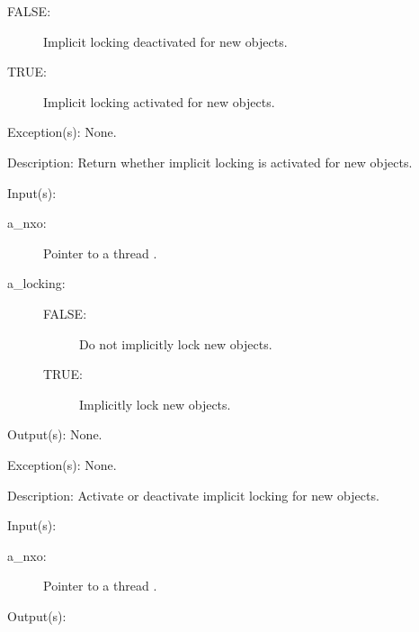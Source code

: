 \begin{capi}
\begin{capilist}
\begin{description}
			\begin{description}\item[]
			\item[FALSE: ]
				Implicit locking deactivated for new objects.
			\item[TRUE: ]
				Implicit locking activated for new objects.
			\end{description}
		\end{description}
	\item[Exception(s): ] None.
	\item[Description: ]
		Return whether implicit locking is activated for new objects.
	\end{capilist}
\label{nxo_thread_setlocking}
	\begin{capilist}
	\item[Input(s): ]
		\begin{description}\item[]
		\item[a\_nxo: ]
			Pointer to a thread .
		\item[a\_locking: ]
			\begin{description}\item[]
			\item[FALSE: ]
				Do not implicitly lock new objects.
			\item[TRUE: ]
				Implicitly lock new objects.
			\end{description}
		\end{description}
	\item[Output(s): ] None.
	\item[Exception(s): ] None.
	\item[Description: ]
		Activate or deactivate implicit locking for new objects.
	\end{capilist}
\label{nxo_thread_nx_get}
	\begin{capilist}
	\item[Input(s): ]
		\begin{description}\item[]
		\item[a\_nxo: ]
			Pointer to a thread \classname{nxo}.
		\end{description}
	\item[Output(s): ]
		\begin{description}\item[]

\end{description}
\end{capilist}
\end{capi}
